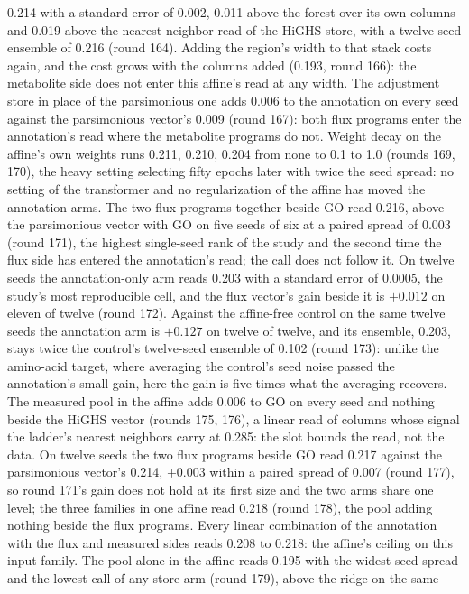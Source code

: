 0.214 with a standard error of 0.002, 0.011 above the forest over its own columns and
0.019 above the nearest-neighbor read of the HiGHS store, with a twelve-seed ensemble
of 0.216 (round 164). Adding the region's width to that stack costs again, and the
cost grows with the columns added (0.193, round 166): the metabolite side does not
enter this affine's read at any width. The adjustment store in place of the
parsimonious one adds 0.006 to the annotation on every seed against the parsimonious
vector's 0.009 (round 167): both flux programs enter the annotation's read where the
metabolite programs do not. Weight decay on the affine's own weights runs 0.211, 0.210,
0.204 from none to 0.1 to 1.0 (rounds 169, 170), the heavy setting selecting fifty
epochs later with twice the seed spread: no setting of the transformer and no
regularization of the affine has moved the annotation arms. The two flux programs
together beside GO read 0.216, above the parsimonious vector with GO on five seeds of
six at a paired spread of 0.003 (round 171), the highest single-seed rank of the study
and the second time the flux side has entered the annotation's read; the call does not
follow it. On twelve seeds the annotation-only arm reads 0.203 with a standard error of
0.0005, the study's most reproducible cell, and the flux vector's gain beside it is
$+0.012$ on eleven of twelve (round 172). Against the affine-free control on the same
twelve seeds the annotation arm is $+0.127$ on twelve of twelve, and its ensemble,
0.203, stays twice the control's twelve-seed ensemble of 0.102 (round 173): unlike the
amino-acid target, where averaging the control's seed noise passed the annotation's
small gain, here the gain is five times what the averaging recovers. The measured pool in
the affine adds 0.006 to GO on every seed and nothing beside the HiGHS vector (rounds
175, 176), a linear read of columns whose signal the ladder's nearest neighbors carry at
0.285: the slot bounds the read, not the data. On twelve seeds the two flux programs
beside GO read 0.217 against the parsimonious vector's 0.214, $+0.003$ within a paired
spread of 0.007 (round 177), so round 171's gain does not hold at its first size and
the two arms share one level; the three families in one affine read 0.218 (round 178),
the pool adding nothing beside the flux programs. Every linear combination of the
annotation with the flux and measured sides reads 0.208 to 0.218: the affine's ceiling
on this input family. The pool alone in the affine reads 0.195 with the widest seed
spread and the lowest call of any store arm (round 179), above the ridge on the same
